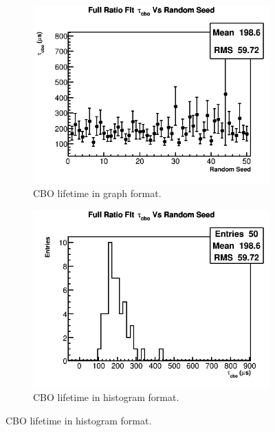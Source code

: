 		\begin{figure}[]
		\centering
		    \begin{subfigure}[t]{0.45\textwidth}
			    \centering
				\includegraphics[width=\textwidth]{RatioCBO_tau_cbo_Vs_Iter_Canv}
			    \caption{CBO lifetime in graph format.}
		    \end{subfigure}
		    \hspace{4mm}
		    \begin{subfigure}[t]{0.45\textwidth}
			    \centering
				\includegraphics[width=\textwidth]{RatioCBO_tau_cbo_Vs_Iter_Canv_hist}
			    \caption{CBO lifetime in histogram format.}
		    \end{subfigure}%

\end{figure}
